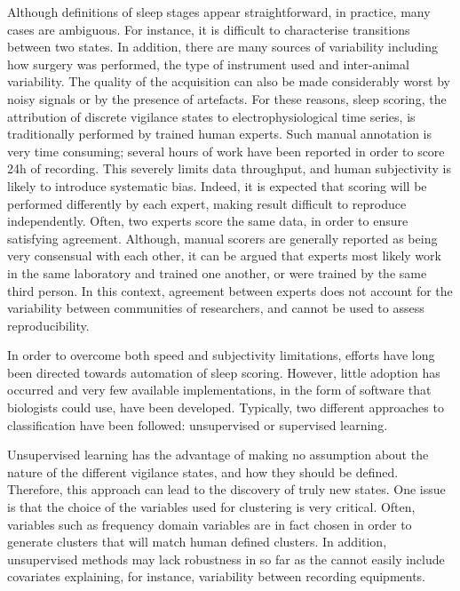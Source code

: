 Although definitions of sleep stages appear straightforward, in practice, many cases are ambiguous.
For instance, it is difficult to characterise transitions between two states.
In addition, there are many sources of variability including how surgery was performed, the type of instrument used and inter-animal variability.
The quality of the acquisition can also be made considerably worst by noisy signals or by the presence of artefacts.
For these reasons, sleep scoring, \ie{} the attribution of discrete vigilance states to electrophysiological time series,
is traditionally performed by trained human experts.
Such manual annotation is very time consuming; several hours of work have been reported in order to score 24h of recording.
This severely limits data throughput, and human subjectivity is likely to introduce systematic bias.
Indeed, it is expected that scoring will be performed differently by each expert, making result difficult to reproduce independently.
Often, two experts score the same data, in order to ensure satisfying agreement.
Although, manual scorers are generally reported as being very consensual with
each other\cite{costa-miserachs_automated_2003,sen_comparative_2014}, it can be
argued that experts most likely work in the same laboratory and trained one another, or were trained by the same third person.
In this context, agreement between experts does not account for the variability between communities of researchers, and cannot be used to assess reproducibility.

In order to overcome both speed and subjectivity limitations, efforts have long
been directed towards automation of sleep
scoring\cite{chouvet_automatic_1980, haustein_automatic_1986}.
However, little adoption has occurred and very few available implementations, in the form of software that biologists could use, have been developed.
Typically, two different approaches to classification have been followed: unsupervised or supervised learning.

Unsupervised learning \cite{l&xe4_sleep_2012,sunagawa_faster:_2013} has the
advantage of making no assumption about the nature of the different vigilance states, and how they should be defined.
Therefore, this approach can lead to the discovery of truly new states.
One issue is that the choice of the variables used for clustering is very
critical.
Often, variables such as frequency domain variables are in fact chosen in order
to generate clusters that will match human defined clusters.
In addition, unsupervised methods may lack robustness\cite{sunagawa_faster:_2013} in so far as the
cannot easily include covariates explaining, for instance, variability between recording equipments.

